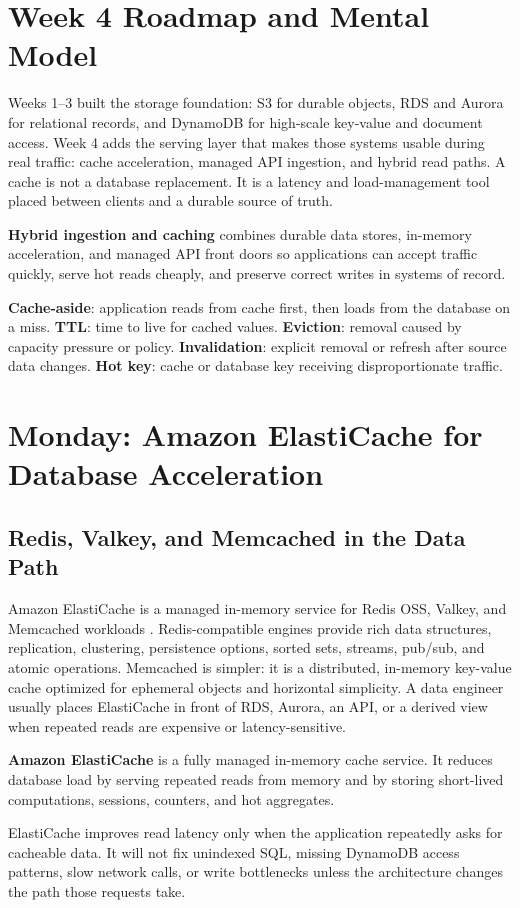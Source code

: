 \section{Week 4 Roadmap and Mental Model}
Weeks 1--3 built the storage foundation: S3 for durable objects, RDS and Aurora for relational records, and DynamoDB for high-scale key-value and document access. Week 4 adds the serving layer that makes those systems usable during real traffic: cache acceleration, managed API ingestion, and hybrid read paths. A cache is not a database replacement. It is a latency and load-management tool placed between clients and a durable source of truth.
\begin{definitionbox}
\textbf{Hybrid ingestion and caching} combines durable data stores, in-memory acceleration, and managed API front doors so applications can accept traffic quickly, serve hot reads cheaply, and preserve correct writes in systems of record.
\end{definitionbox}
\begin{keyterms}
\textbf{Cache-aside}: application reads from cache first, then loads from the database on a miss. \textbf{TTL}: time to live for cached values. \textbf{Eviction}: removal caused by capacity pressure or policy. \textbf{Invalidation}: explicit removal or refresh after source data changes. \textbf{Hot key}: cache or database key receiving disproportionate traffic.
\end{keyterms}
\section{Monday: Amazon ElastiCache for Database Acceleration}
\subsection{Redis, Valkey, and Memcached in the Data Path}
Amazon ElastiCache is a managed in-memory service for Redis OSS, Valkey, and Memcached workloads \cite{awsElastiCacheUserGuide}. Redis-compatible engines provide rich data structures, replication, clustering, persistence options, sorted sets, streams, pub/sub, and atomic operations. Memcached is simpler: it is a distributed, in-memory key-value cache optimized for ephemeral objects and horizontal simplicity. A data engineer usually places ElastiCache in front of RDS, Aurora, an API, or a derived view when repeated reads are expensive or latency-sensitive.
\begin{definitionbox}
\textbf{Amazon ElastiCache} is a fully managed in-memory cache service. It reduces database load by serving repeated reads from memory and by storing short-lived computations, sessions, counters, and hot aggregates.
\end{definitionbox}
\begin{notebox}
ElastiCache improves read latency only when the application repeatedly asks for cacheable data. It will not fix unindexed SQL, missing DynamoDB access patterns, slow network calls, or write bottlenecks unless the architecture changes the path those requests take.
\end{notebox}
